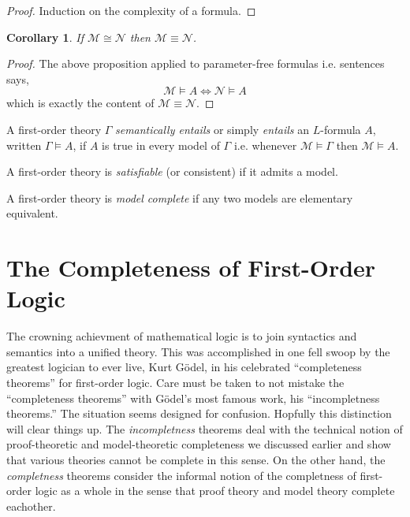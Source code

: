 \documentclass[12pt]{article}
\newcommand{\entails}{\models}
\newcommand{\Mmod}{\mathcal{M}}
\newcommand{\Nmod}{\mathcal{N}}
\newenvironment{definition}[1][Definition:]{\begin{trivlist}
\item[\hskip \labelsep {\bfseries #1}]}{\end{trivlist}}
\theoremstyle{theorem}
\newtheorem{corollary}[theorem]{Corollary}
\theoremstyle{definition}
\theoremstyle{definition}
\theoremstyle{remark}
\theoremstyle{definition}
\theoremstyle{remark}
\begin{document}
\begin{proof}
Induction on the complexity of a formula. 
\end{proof}

\begin{corollary}
If $\Mmod \cong \Nmod$ then $\Mmod \equiv \Nmod$.
\end{corollary}

\begin{proof}
The above proposition applied to parameter-free formulas i.e. sentences says,
\[ \Mmod \entails A \iff \Nmod \entails A \]
which is exactly the content of $\Mmod \equiv \Nmod$. 
\end{proof}

\begin{definition}
A first-order theory $\Gamma$ \textit{semantically entails} or simply \textit{entails} an $L$-formula $A$, written $\Gamma \entails A$, if $A$ is true in every model of $\Gamma$ i.e. whenever $\Mmod \entails \Gamma$ then $\Mmod \entails A$.  
\end{definition}

\begin{definition}
A first-order theory is \textit{satisfiable} (or consistent) if it admits a model.  
\end{definition}

\begin{definition}
A first-order theory is \textit{model complete} if any two models are elementary equivalent.
\end{definition}


\section{The Completeness of First-Order Logic}

The crowning achievment of mathematical logic is to join syntactics and semantics into a unified theory. This was accomplished in one fell swoop by the greatest logician to ever live, Kurt G\"{o}del, in his celebrated ``completeness theorems'' for first-order logic. Care must be taken to not mistake the ``completeness theorems'' with G\"{o}del's most famous work, his ``incompletness theorems.'' The situation seems designed for confusion. Hopfully this distinction will clear things up. The \textit{incompletness} theorems deal with the technical notion of proof-theoretic and model-theoretic completeness we discussed earlier and show that various theories cannot be complete in this sense. On the other hand, the \textit{completness} theorems consider the informal notion of the completness of first-order logic as a whole in the sense that proof theory and model theory complete eachother. 
\end{document}
